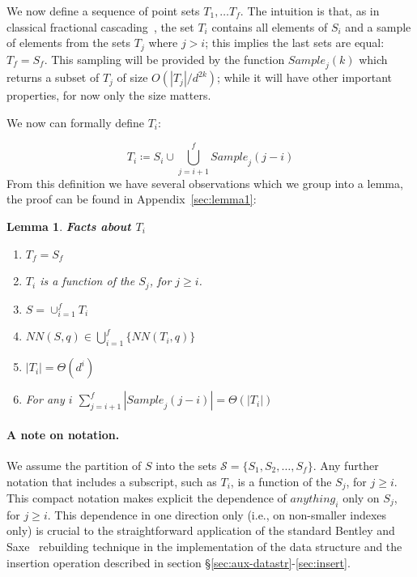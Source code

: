 \documentclass[12pt,a4paper,USenglish,cleveref, autoref, thm-restate]{article}
\newcommand{\Sample}{\mathit{Sample}}
\newcommand{\NN}{\mathit{NN}}
\newcommand{\mcS}{\mathcal{S}}
\newtheorem{lemma}{Lemma}
\newif\ifsocg
\newcommand{\Sample}{\mathit{Sample}}
\newcommand{\NN}{\mathit{NN}}
\newcommand{\mcS}{\mathcal{S}}
\newcommand{\Sample}{\mathit{Sample}}
\newcommand{\NN}{\mathit{NN}}
\newcommand{\mcS}{\mathcal{S}}
\begin{document}
We now define a sequence of point sets $T_1,\ldots T_{f}$. The intuition is that, as in classical fractional cascading~\cite{ChazelleG86}, the set $T_i$ contains all elements of 
$S_i$ and a sample of elements from the sets  $T_j$ where $j>i$; this implies the last sets are equal: $T_{f}=S_{f}$.
This sampling will be provided by the function $\Sample_j(k)$ which returns a subset of $T_j$ of size $O(|T_j|/d^{2k})$; while it will have other important properties, for now only the size matters. 

We now can formally define $T_i$:

$$ T_i \coloneqq S_i \cup \bigcup_{j=i+1}^{f} \Sample_j(j-i) $$
\ifarxiv
From this definition we have several observations which we group into a lemma, the proof can be found in Appendix~\ref{sec:lemma1}:
\fi
\ifsocg
From this definition we have several observations which we group into a lemma, the proof can be found in the full version of this paper:
\fi
\begin{lemma}{\bf Facts about $T_i$}  \label{lem:facts}
	\begin{enumerate}
 \setlength{\itemsep}{1pt}
\setlength{\parskip}{0pt}
\setlength{\parsep}{0pt} 
    \item $T_{f}=S_{f}$
    \item $T_i$ is a function of the $S_j$, for $j \geq i$.
    \item $S=\cup_{i=1}^{f} T_i$
    \item $\NN(S,q) \in \bigcup_{i=1}^f \{ \NN(T_i,q)\} $
    \item $|T_i| = \Theta(d^i)$
    \item For any $i$
	$ \sum_{j=i+1}^f |\Sample_j(j-i)|=\Theta(|T_i|)$
\end{enumerate}
\end{lemma}


\paragraph*{A note on notation.}
We assume the partition of $S$ into the sets $\mcS=\{S_1, S_2, \ldots , S_{f}\}$. Any further notation that includes a subscript, such as $T_i$, is a function of the $S_j$, for $j \geq i$. This compact notation makes explicit the dependence of $\mathit{anything}_i$ only on $S_j$, for $j\geq i$. This dependence in one direction only (i.e., on non-smaller indexes only) is crucial to the straightforward application of the standard Bentley and Saxe~\cite{BentleyS80} rebuilding technique in the implementation of the data structure and the insertion operation described in section \S\ref{sec:aux-datastr}-\ref{sec:insert}.
\end{document}
